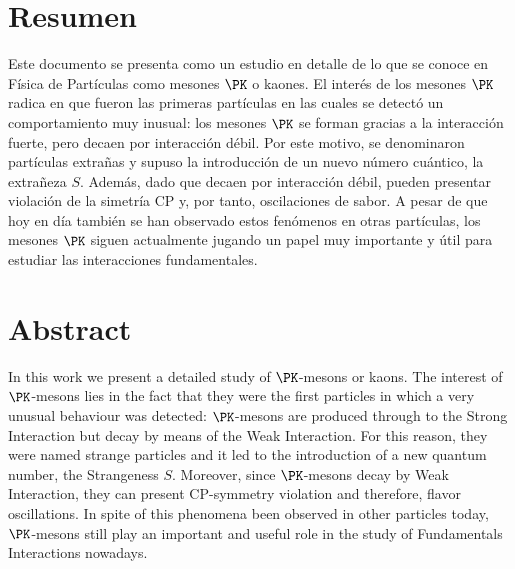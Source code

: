 \chapter*{Resumen}
\label{cap:abstract}

Este documento se presenta como un estudio en detalle de lo que se conoce en Física de Partículas como mesones $\PK$ o kaones. El interés de los mesones $\PK$ radica en que fueron las primeras partículas en las cuales se detectó un comportamiento muy inusual: los mesones $\PK$ se forman gracias a la interacción fuerte, pero decaen por interacción débil. Por este motivo, se denominaron partículas extrañas y supuso la introducción de un nuevo número cuántico, la extrañeza $S$. Además, dado que decaen por interacción débil, pueden presentar violación de la simetría CP y, por tanto, oscilaciones de sabor. A pesar de que hoy en día también se han observado estos fenómenos en otras partículas, los mesones $\PK$ siguen actualmente jugando un papel muy importante y útil para estudiar las interacciones fundamentales. 
\vspace{2cm}

{\let\clearpage\relax\chapter*{Abstract}}
In this work we present a detailed study of $\PK$-mesons or kaons. The interest of $\PK$-mesons lies in the fact that they were the first particles in which a very unusual behaviour was detected: $\PK$-mesons are produced through to the Strong Interaction but decay by means of the Weak Interaction. For this reason, they were named strange particles and it led to the introduction of a new quantum number, the Strangeness $S$. Moreover, since $\PK$-mesons decay by Weak Interaction, they can present CP-symmetry violation and therefore, flavor oscillations. In spite of this phenomena been observed  in other particles today, $\PK$-mesons still play an important and useful role in the study of Fundamentals Interactions nowadays.